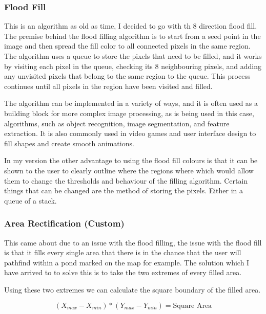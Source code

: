 \begin{FlushLeft}
    \subsubsection{Flood Fill}
    This is an algorithm as old as time, I decided to go with th 8 direction flood fill. The premise behind the flood filling algorithm is to start from a seed point in the image and then spread the fill color to all connected pixels in the same region. The algorithm uses a queue to store the pixels that need to be filled, and it works by visiting each pixel in the queue, checking its 8 neighbouring pixels, and adding any unvisited pixels that belong to the same region to the queue. This process continues until all pixels in the region have been visited and filled. \\ \bk

    The algorithm can be implemented in a variety of ways, and it is often used as a building block for more complex image processing, as is being used in this case, algorithms, such as object recognition, image segmentation, and feature extraction. It is also commonly used in video games and user interface design to fill shapes and create smooth animations. \\ \bk

    In my version the other advantage to using the flood fill colours is that it can be shown to the user to clearly outline where the regions where which would allow them to change the thresholds and behaviour of the filling algorithm. Certain things that can be changed are the method of storing the pixels. Either in a queue of a stack. \\ 
    \bk

    \subsubsection{Area Rectification (Custom)}
    This came about due to an issue with the flood filling, the issue with the flood fill is that it fills every single area that there is in the chance that the user will pathfind within a pond marked on the map for example. The solution which I have arrived to to solve this is to take the two extremes of every filled area. \\ \bk

    Using these two extremes we can calculate the square boundary of the filled area.

    $$
        (X_{max} - X_{min}) * (Y_{max} - Y_{min}) = \text{Square Area} 
    $$


\end{FlushLeft}
